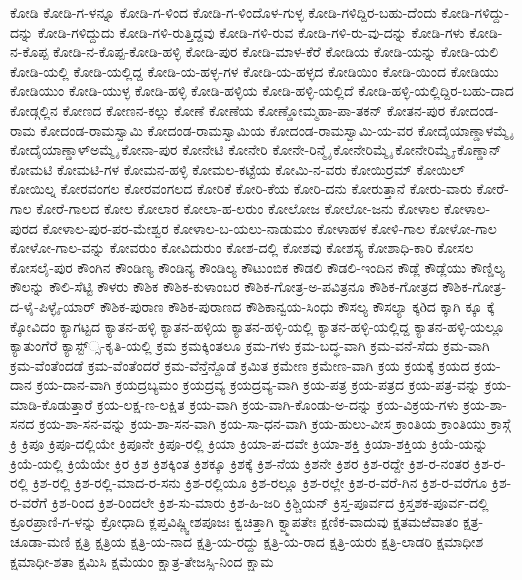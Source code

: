 ಕೋಡಿ
ಕೋಡಿ-ಗ-ಳನ್ನೂ
ಕೋಡಿ-ಗ-ಳಿಂದ
ಕೋಡಿ-ಗ-ಳಿಂದೊಳ-ಗುಳ್ಳ
ಕೋಡಿ-ಗಳಿದ್ದಿರ-ಬಹು-ದೆಂದು
ಕೋಡಿ-ಗಳಿದ್ದು-ದನ್ನು
ಕೋಡಿ-ಗಳಿದ್ದುದು
ಕೋಡಿ-ಗಳಿ-ರುತ್ತಿದ್ದವು
ಕೋಡಿ-ಗಳಿ-ರುವ
ಕೋಡಿ-ಗಳಿ-ರು-ವು-ದನ್ನು
ಕೋಡಿ-ಗಳು
ಕೋಡಿ-ನ-ಕೊಪ್ಪ
ಕೋಡಿ-ನ-ಕೊಪ್ಪ-ಕೋಡಿ-ಹಳ್ಳಿ
ಕೋಡಿ-ಪುರ
ಕೋಡಿ-ಮಾಳ-ಕೆರೆ
ಕೋಡಿಯ
ಕೋಡಿ-ಯನ್ನು
ಕೋಡಿ-ಯಲಿ
ಕೋಡಿ-ಯಲ್ಲಿ
ಕೋಡಿ-ಯಲ್ಲಿದ್ದ
ಕೋಡಿ-ಯ-ಹಳ್ಳ-ಗಳ
ಕೋಡಿ-ಯ-ಹಳ್ಳದ
ಕೋಡಿಯಿಂ
ಕೋಡಿ-ಯಿಂದ
ಕೋಡಿಯು
ಕೋಡಿಯುಂ
ಕೋಡಿ-ಯುಳ್ಳ
ಕೋಡಿ-ಹಳ್ಳಿ
ಕೋಡಿ-ಹಳ್ಳಿಯ
ಕೋಡಿ-ಹಳ್ಳಿ-ಯಲ್ಲಿದೆ
ಕೋಡಿ-ಹಳ್ಳಿ-ಯಲ್ಲಿದ್ದಿರ-ಬಹು-ದಾದ
ಕೋಡ್ಗಲ್ಲಿನ
ಕೋಣದ
ಕೋಣನ-ಕಲ್ಲು
ಕೋಣೆ
ಕೋಣೆಯ
ಕೋಣ್ಡೋಮ್ಮಹಾ-ಪಾ-ತಕನ್
ಕೋತನ-ಪುರ
ಕೋದಂಡ-ರಾಮ
ಕೋದಂಡ-ರಾಮಸ್ವಾಮಿ
ಕೋದಂಡ-ರಾಮಸ್ವಾಮಿಯ
ಕೋದಂಡ-ರಾಮಸ್ವಾಮಿ-ಯ-ವರ
ಕೋದೈಯಾಣ್ಡಾಳಮ್ಮೈ
ಕೋದೈಯಾಣ್ಡಾಳ್ಅಮ್ಮೈ
ಕೋನಾ-ಪುರ
ಕೋನೇಟಿ
ಕೋನೇರಿ
ಕೋನೇ-ರಿನ್ಮೈ
ಕೋನೇರಿಮ್ಮೈ
ಕೋನೇರಿಮ್ಮೈ-ಕೊಣ್ಡಾನ್
ಕೋಮಟಿ
ಕೋಮಟಿ-ಗಳ
ಕೋಮನ-ಹಳ್ಳಿ
ಕೋಮಲ-ಕಟ್ಟೆಯ
ಕೋಮಿ-ನ-ವರು
ಕೋಯಿರ್ರಮ್
ಕೋಯಿಲ್
ಕೋಯಿಲ್ನ
ಕೋರವಂಗಲ
ಕೋರವಂಗಲದ
ಕೋರಿಕೆ
ಕೋರಿ-ಕೆಯ
ಕೋರಿ-ದನು
ಕೋರುತ್ತಾನೆ
ಕೋರು-ವಾರು
ಕೋರೆ-ಗಾಲ
ಕೋರೆ-ಗಾಲದ
ಕೋಲ
ಕೋಲಾರ
ಕೋಲಾ-ಹ-ಲರುಂ
ಕೋಲೋಜ
ಕೋಲೋ-ಜನು
ಕೋಳಾಲ
ಕೋಳಾಲ-ಪುರದ
ಕೋಳಾಲ-ಪುರ-ಪರ-ಮೇಶ್ವರ
ಕೋಳಾಲ-ಬ-ಯಲು-ನಾಡುಮಂ
ಕೋಳಾಹಳ
ಕೋಳಿ-ಗಾಲ
ಕೋಳೋ-ಗಾಲ
ಕೋಳೋ-ಗಾಲ-ವನ್ನು
ಕೋವರುಂ
ಕೋವಿದುರುಂ
ಕೋಶ-ದಲ್ಲಿ
ಕೋಶವು
ಕೋಶಸ್ಯ
ಕೋಶಾಧಿ-ಕಾರಿ
ಕೋಸಲ
ಕೋಸಲೈ-ಪುರ
ಕೌಂಗಿನ
ಕೌಂಡಿಣ್ಯ
ಕೌಂಡಿನ್ಯ
ಕೌಂಡಿಲ್ಯ
ಕೌಟುಂಬಿಕ
ಕೌಡಲಿ
ಕೌಡಲಿ-ಇಂದಿನ
ಕೌಡ್ಲೆ
ಕೌಡ್ಲೆಯು
ಕೌಣ್ಡಿಲ್ಯ
ಕೌಲನ್ನು
ಕೌಲಿ-ಸೆಟ್ಟಿ
ಕೌಳರು
ಕೌಶಿಕ
ಕೌಶಿಕ-ಕುಳಾಂಬರ
ಕೌಶಿಕ-ಗೋತ್ರ-ಅ-ಪವಿತ್ರನೂ
ಕೌಶಿಕ-ಗೋತ್ರದ
ಕೌಶಿಕ-ಗೋತ್ರ-ದ-ಳೈ-ಪಿಳ್ಳೈ-ಯಾರ್
ಕೌಶಿಕ-ಪುರಾಣ
ಕೌಶಿಕ-ಪುರಾಣದ
ಕೌಶಿಕಾನ್ವಯ-ಸಿಂಧು
ಕೌಸಲ್ಯ
ಕೌಸಲ್ಯಾ
ಕ್ಕðದ
ಕ್ಕಾಗಿ
ಕ್ಕೂ
ಕ್ಕೆ
ಕ್ಕೋವಿದಂ
ಕ್ಯಾಗಟ್ಟದ
ಕ್ಯಾತನ-ಹಳ್ಳಿ
ಕ್ಯಾತನ-ಹಳ್ಳಿಯ
ಕ್ಯಾತನ-ಹಳ್ಳಿ-ಯಲ್ಲಿ
ಕ್ಯಾತನ-ಹಳ್ಳಿ-ಯಲ್ಲಿದ್ದ
ಕ್ಯಾತನ-ಹಳ್ಳಿ-ಯಲ್ಲೂ
ಕ್ಯಾತುಂಗೆರೆ
ಕ್ಯಾಸ್ಟ್್ಸ-ಕೃತಿ-ಯಲ್ಲಿ
ಕ್ರಮ
ಕ್ರಮಕ್ಕಿಂತಲೂ
ಕ್ರಮ-ಗಳು
ಕ್ರಮ-ಬದ್ಧ-ವಾಗಿ
ಕ್ರಮ-ವನೆ-ಸೆದು
ಕ್ರಮ-ವಾಗಿ
ಕ್ರಮ-ವೆಂತೆಂದಡೆ
ಕ್ರಮ-ವೆಂತೆಂದರೆ
ಕ್ರಮ-ವೆನ್ತೆನ್ದೊಡೆ
ಕ್ರಮಿತ
ಕ್ರಮೇಣ
ಕ್ರಮೇಣ-ವಾಗಿ
ಕ್ರಯ
ಕ್ರಯಕ್ಕೆ
ಕ್ರಯದ
ಕ್ರಯ-ದಾನ
ಕ್ರಯ-ದಾನ-ವಾಗಿ
ಕ್ರಯದ್ರಬ್ಯಮಂ
ಕ್ರಯದ್ರವ್ಯ
ಕ್ರಯದ್ರವ್ಯ-ವಾಗಿ
ಕ್ರಯ-ಪತ್ರ
ಕ್ರಯ-ಪತ್ರದ
ಕ್ರಯ-ಪತ್ರ-ವನ್ನು
ಕ್ರಯ-ಮಾಡಿ-ಕೊಡುತ್ತಾರೆ
ಕ್ರಯ-ಲಕ್ಷ-ಣ-ಲಕ್ಷಿತ
ಕ್ರಯ-ವಾಗಿ
ಕ್ರಯ-ವಾಗಿ-ಕೊಂಡು-ಅ-ದನ್ನು
ಕ್ರಯ-ವಿಕ್ರಯ-ಗಳು
ಕ್ರಯ-ಶಾ-ಸನದ
ಕ್ರಯ-ಶಾ-ಸನ-ವನ್ನು
ಕ್ರಯ-ಶಾ-ಸನ-ವಾಗಿ
ಕ್ರಯ-ಸಾ-ಧನ-ವಾಗಿ
ಕ್ರಯ-ಹುಲು-ವೀಸ
ಕ್ರಾಂತಿಯ
ಕ್ರಾಂತಿಯು
ಕ್ರಾಸ್ಗೆ
ಕ್ರಿ
ಕ್ರಿಪೂ
ಕ್ರಿಪೂ-ದಲ್ಲಿಯೇ
ಕ್ರಿಪೂನೇ
ಕ್ರಿಪೂ-ರಲ್ಲಿ
ಕ್ರಿಯಾ
ಕ್ರಿಯಾ-ಪ-ದವೇ
ಕ್ರಿಯಾ-ಶಕ್ತಿ
ಕ್ರಿಯಾ-ಶಕ್ತಿಯ
ಕ್ರಿಯೆ-ಯನ್ನು
ಕ್ರಿಯೆ-ಯಲ್ಲಿ
ಕ್ರಿಯೆಯೇ
ಕ್ರಿರ
ಕ್ರಿಶ
ಕ್ರಿಶಕ್ಕಿಂತ
ಕ್ರಿಶಕ್ಕೂ
ಕ್ರಿಶಕ್ಕೆ
ಕ್ರಿಶ-ನೆಯ
ಕ್ರಿಶನೇ
ಕ್ರಿಶರ
ಕ್ರಿಶ-ರದ್ದೇ
ಕ್ರಿಶ-ರ-ನಂತರ
ಕ್ರಿಶ-ರ-ರಲ್ಲಿ
ಕ್ರಿಶ-ರಲ್ಲಿ
ಕ್ರಿಶ-ರಲ್ಲಿ-ಮಾದ-ರ-ಸನು
ಕ್ರಿಶ-ರಲ್ಲಿಯೂ
ಕ್ರಿಶ-ರಲ್ಲೂ
ಕ್ರಿಶ-ರಲ್ಲೇ
ಕ್ರಿಶ-ರ-ವರೆ-ಗಿನ
ಕ್ರಿಶ-ರ-ವರೆಗೂ
ಕ್ರಿಶ-ರ-ವರೆಗೆ
ಕ್ರಿಶ-ರಿಂದ
ಕ್ರಿಶ-ರಿಂದಲೇ
ಕ್ರಿಶ-ಸು-ಮಾರು
ಕ್ರಿಶ-ಹಿ-ಜರಿ
ಕ್ರಿಶ್ಚಿಯನ್
ಕ್ರಿಸ್ತ-ಪೂರ್ವದ
ಕ್ರಿಸ್ತಶಕ-ಪೂರ್ವ-ದಲ್ಲಿ
ಕ್ರೂರಪ್ರಾಣಿ-ಗ-ಳನ್ನು
ಕ್ರೋಧಾದಿ
ಕ್ಲಪ್ತವಿಷ್ಣ್ವೀಶಪೂಜಃ
ಕ್ವಚಿತ್ತಾಗಿ
ಕ್ವ್ಮಾಪತೇಃ
ಕ್ಷಣಿಕ-ವಾದುವು
ಕ್ಷತಮಱೆವಾತಂ
ಕ್ಷತ್ರ-ಚೂಡಾ-ಮಣಿ
ಕ್ಷತ್ರಿ
ಕ್ಷತ್ರಿಯ
ಕ್ಷತ್ರಿ-ಯ-ನಾದ
ಕ್ಷತ್ರಿ-ಯ-ರದ್ದು
ಕ್ಷತ್ರಿ-ಯ-ರಾದ
ಕ್ಷತ್ರಿ-ಯರು
ಕ್ಷತ್ರಿ-ಲಾಡರಿ
ಕ್ಷಮಾಧೀಶ
ಕ್ಷಮಾಧೀ-ಶತಾ
ಕ್ಷಮಿಸಿ
ಕ್ಷಮೆಯಂ
ಕ್ಷಾತ್ರ-ತೇಜಸ್ಸಿ-ನಿಂದ
ಕ್ಷಾಮ
